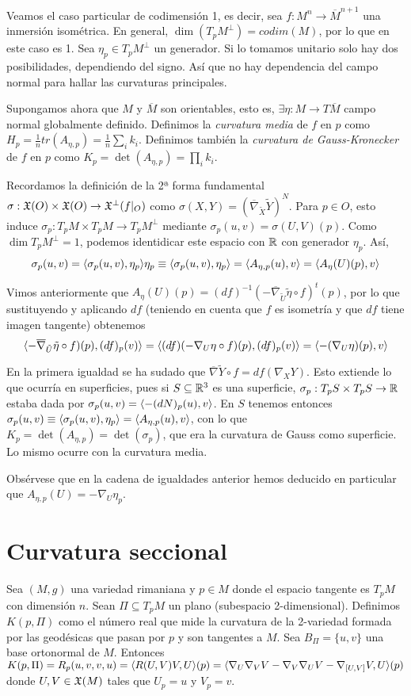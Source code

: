\documentclass[GSR.tex]{subfiles}
\begin{document}
\begin{ej}
Veamos el caso particular de codimensión 1, es decir, sea $f:M^n\to \overline{M}^{n+1}$ una inmersión isométrica. En general, $\dim(T_pM^\perp)=codim(M)$, por lo que en este caso es 1. Sea $\eta_p\in T_pM^\perp$ un generador. Si lo tomamos unitario solo hay dos posibilidades, dependiendo del signo. Así que no hay dependencia del campo normal para hallar las curvaturas principales. 

Supongamos ahora que $M$ y $\overline{M}$ son orientables, esto es, $\exists\eta:M\to T\overline{M}$ campo normal globalmente definido. Definimos la \emph{curvatura media} de $f$ en $p$ como $H_p=\frac{1}{n}tr(A_{\eta,p})=\frac{1}{n}\sum_i k_i$. Definimos también la \emph{curvatura de Gauss-Kronecker} de $f$ en $p$ como $K_p=\det(A_{\eta,p})=\prod_i k_i$.

Recordamos la definición de la 2ª forma fundamental $\sigma:{\mathfrak{X}}(O)\times{\mathfrak{X}}(O)\to{\mathfrak{X}}^\perp(f|_O)$ como $\sigma(X,Y)=(\overline{\nabla}_{\tilde{X}}\tilde{Y})^N$. Para $p\in O$, esto induce $\sigma_p:T_pM\times T_pM\to T_pM^\perp$ mediante $\sigma_p(u,v)=\sigma(U,V)(p)$. Como $\dim T_pM^\perp=1$, podemos identidicar este espacio con $\mathbb{R}$ con generador $\eta_p$. Así, 
$$\sigma_p(u,v)=\langle{\sigma_p(u,v),\eta_p}\rangle\eta_p\equiv \langle{\sigma_p(u,v),\eta_p}\rangle=\langle{A_{\eta,p}(u),v}\rangle=\langle{A_\eta(U)(p),v}\rangle$$

Vimos anteriormente que $A_\eta(U)(p)=(df)^{-1}(-\overline{\nabla}_{\tilde{U}}\tilde{\eta}\circ f)^t(p)$, por lo que sustituyendo y aplicando $df$ (teniendo en cuenta que $f$ es isometría y que $df$ tiene imagen tangente) obtenemos
$$\langle{-\overline{\nabla}_{\tilde{U}}\tilde{\eta}\circ f)(p), (df)_p(v)}\rangle=\langle{(df)(-\nabla_{U}\eta\circ f)(p), (df)_p(v)}\rangle=\langle{-(\nabla_U\eta)(p),v}\rangle$$

En la primera igualdad se ha sudado que $\overline{\nabla}\tilde{Y}\circ f=df(\nabla_XY)$. Esto extiende lo que ocurría en superficies, pues si $S\subseteq\mathbb{R}^3$ es una superficie, $\sigma_p:T_pS\times T_pS\to \mathbb{R}$ estaba dada por $\sigma_p(u,v)=\langle{-(dN)_p(u),v}\rangle$. En $S$ tenemos entonces $\sigma_p(u,v)\equiv \langle{\sigma_p(u,v),\eta_p}\rangle=\langle{A_{\eta,p}(u),v}\rangle$, con lo que $K_p=\det(A_{\eta,p})=\det(\sigma_p)$, que era la curvatura de Gauss como superficie. Lo mismo ocurre con la curvatura media. 

Obsérvese que en la cadena de igualdades anterior hemos deducido en particular que $A_{\eta,p}(U)=-\nabla_U\eta_p$. 
\end{ej} 


\section{Curvatura seccional}
Sea $(M,g)$ una variedad rimaniana y $p\in M$ donde el espacio tangente es $T_pM$ con dimensión $n$. Sean $\Pi\subseteq T_pM$ un plano (subespacio 2-dimensional). Definimos $K(p,\Pi)$ como el número real que mide la curvatura de la 2-variedad formada por las geodésicas que pasan por $p$ y son tangentes a $M$. Sea $B_\Pi=\{u,v\}$ una base ortonormal de $M$. Entonces $K(p,\Pi)=R_p(u,v,v,u)=\langle{R(U,V)V,U}\rangle(p)=\langle{\nabla_U\nabla_VV-\nabla_V\nabla_UV-\nabla_{[U,V]}V,U}\rangle(p)$ donde $U,V\in{\mathfrak{X}}(M)$ tales que $U_p=u$ y $V_p=v$. 
\end{document}

